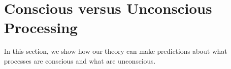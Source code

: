 \documentclass[utf8]{article}
\begin{document}
    
    
	\section{Conscious versus Unconscious Processing}\label{sec:Conscious versus Unconscious Processing}
	    In this section, we show how our theory can make predictions about what processes are conscious and what are unconscious. 
	    
	    
        
\end{document}
